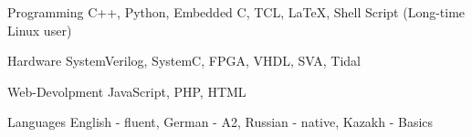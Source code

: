 

\begin{cvskills}

  \cvskill
    {Programming} %
    {C++, Python, Embedded C, TCL, LaTeX, Shell Script (Long-time Linux user)} %

  \cvskill
    {Hardware} %
    {SystemVerilog, SystemC, FPGA, VHDL, SVA, Tidal} %

  \cvskill
    {Web-Devolpment} %
    {JavaScript, PHP, HTML} %

  \cvskill
    {Languages} %
    {English - fluent, German - A2, Russian - native, Kazakh - Basics} %

\end{cvskills}
